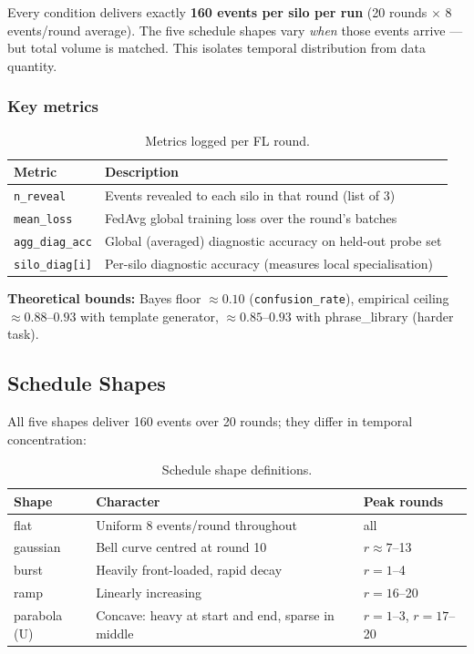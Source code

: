 \documentclass[utf8]{frontiers_suppmat} %
\begin{document}
Every condition delivers exactly \textbf{160 events per silo per run} (20
rounds $\times$ 8 events/round average). The five schedule shapes vary
\emph{when} those events arrive --- but total volume is matched. This
isolates temporal distribution from data quantity.

\subsubsection{Key metrics}

\begin{table}[H]
  \centering
  \caption{Metrics logged per FL round.}
  \begin{tabular}{ll}
    \toprule
    Metric & Description \\
    \midrule
    \texttt{n\_reveal} & Events revealed to each silo in that round (list of 3) \\
    \texttt{mean\_loss} & FedAvg global training loss over the round's batches \\
    \texttt{agg\_diag\_acc} & Global (averaged) diagnostic accuracy on held-out probe set \\
    \texttt{silo\_diag[i]} & Per-silo diagnostic accuracy (measures local specialisation) \\
    \bottomrule
  \end{tabular}
\end{table}

\textbf{Theoretical bounds:} Bayes floor $\approx 0.10$
(\texttt{confusion\_rate}), empirical ceiling $\approx 0.88$--$0.93$ with
template generator, $\approx 0.85$--$0.93$ with phrase\_library (harder
task).

\subsection{Schedule Shapes}

All five shapes deliver 160 events over 20 rounds; they differ in temporal
concentration:

\begin{table}[H]
  \centering
  \caption{Schedule shape definitions.}
  \begin{tabular}{lll}
    \toprule
    Shape & Character & Peak rounds \\
    \midrule
    flat & Uniform 8 events/round throughout & all \\
    gaussian & Bell curve centred at round 10 & $r\approx7$--13 \\
    burst & Heavily front-loaded, rapid decay & $r=1$--4 \\
    ramp & Linearly increasing & $r=16$--20 \\
    parabola (U) & Concave: heavy at start and end, sparse in middle & $r=1$--3, $r=17$--20 \\
    \bottomrule
  \end{tabular}
\end{table}
\end{document}
